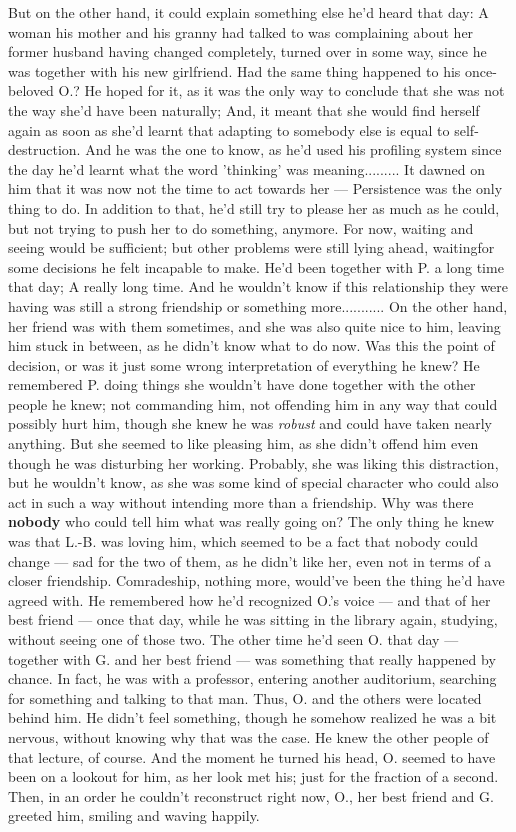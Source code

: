 But on the other hand, it could explain something else he'd heard that day: A woman his mother and his granny had talked to was complaining about her former husband having changed completely, turned over in some way, since he was together with his new girlfriend. Had the same thing happened to his once-beloved O.?
He hoped for it, as it was the only way to conclude that she was not the way she'd have been naturally; And, it meant that she would find herself again as soon as she'd learnt that adapting to somebody else is equal to self-destruction. And he was the one to know, as he'd used his profiling system since the day he'd learnt what the word 'thinking' was meaning.........
It dawned on him that it was now not the time to act towards her --- Persistence was the only thing to do. In addition to that, he'd still try to please her as much as he could, but not trying to push her to do something, anymore. 
For now, waiting and seeing would be sufficient; but other problems were still lying ahead, waitingfor some decisions he felt incapable to make. He'd been together with P. a long time that day; A really long time. And he wouldn't know if this relationship they were having was still a strong friendship or something more...........
On the other hand, her friend was with them sometimes, and she was also quite nice to him, leaving him stuck in between, as he didn't know what to do now. 
Was this the point of decision, or was it just some wrong interpretation of everything he knew?
He remembered P. doing things she wouldn't have done together with the other people he knew; not commanding him, not offending him in any way that could possibly hurt him, though she knew he was \emph{robust} and could have taken nearly anything. But she seemed to like pleasing him, as she didn't offend him even though he was disturbing her working. 
Probably, she was liking this distraction, but he wouldn't know, as she was some kind of special character who could also act in such a way without intending more than a friendship. 
Why was there \textbf{nobody} who could tell him what was really going on? The only thing he knew was that L.-B. was loving him, which seemed to be a fact that nobody could change --- sad for the two of them, as he didn't like her, even not in terms of a closer friendship. Comradeship, nothing more, would've been the thing he'd have agreed with. 
He remembered how he'd recognized O.'s voice --- and that of her best friend --- once that day, while he was sitting in the library again, studying, without seeing one of those two. 
The other time he'd seen O. that day --- together with G. and her best friend --- was something that really happened by chance. In fact, he was with a professor, entering another auditorium, searching for something and talking to that man. Thus, O. and the others were located behind him. He didn't feel something, though he somehow realized he was a bit nervous, without knowing why that was the case. He knew the other people of that lecture, of course. And the moment he turned his head, O. seemed to have been on a lookout for him, as her look met his; just for the fraction of a second. Then, in an order he couldn't reconstruct right now, O., her best friend and G. greeted him, smiling and waving happily. 
